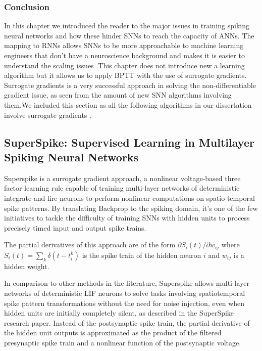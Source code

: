 \documentclass[12pt]{report}
\begin{document}
\subsubsection{Conclusion}
In this chapter we introduced the reader to the major issues in training spiking neural networks and how these hinder SNNs to reach the capacity of ANNs. The mapping to RNNs allows SNNs to be more approachable to machine learning engineers that don't have a neuroscience background and makes it is easier to understand the scaling issues .This chapter does not introduce new a learning algorithm but it allows us to apply BPTT with the use of surrogate gradients. Surrogate gradients is a very successful approach in solving the non-differentiable gradient issue, as seen from the amount of new SNN algorithms involving them.We included this section as all the following algorithms in our dissertation involve surrogate gradients .
\subsection{SuperSpike: Supervised Learning in Multilayer Spiking Neural Networks}
Superspike is a surrogate gradient approach, a nonlinear voltage-based three
factor learning rule capable of training multi-layer networks of deterministic integrate-and-fire neurons to perform nonlinear computations on spatio-temporal spike patterns. By translating Backprop to the spiking domain, it's  one of the few initiatives to tackle the difficulty of training SNNs with hidden units to process precisely timed input and output spike trains.

The partial derivatives of this approach are of the form $\partial S_{i}(t) / \partial w_{i j}$ where $S_{i}(t)=\sum_{k} \delta\left(t-t_{i}^{k}\right)$ is the spike train of the hidden neuron $i$ and $w_{i j}$ is a hidden weight.

In comparison to other methods in the literature, Superspike allows multi-layer networks of deterministic LIF neurons to solve tasks involving spatiotemporal spike pattern transformations without the need for noise injection, even when hidden units are initially completely silent, as described in the SuperSpike research paper. Instead of the postsynaptic spike train, the partial derivative of the hidden unit outputs is approximated as the product of the filtered presynaptic spike train and a nonlinear function of the postsynaptic voltage.
\end{document}
